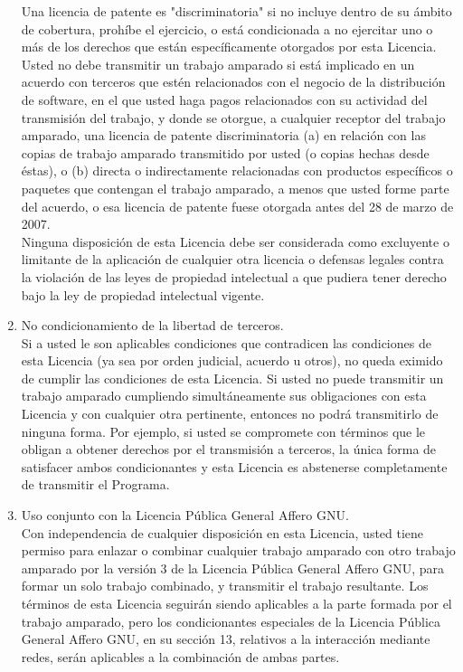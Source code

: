 \begin{enumerate}
		Una licencia de patente es "discriminatoria" si no incluye dentro de su ámbito de cobertura, prohíbe el ejercicio, o está condicionada a no ejercitar uno o más de los derechos que están específicamente otorgados por esta Licencia. Usted no debe transmitir un trabajo amparado si está implicado en un acuerdo con terceros que estén relacionados con el negocio de la distribución de software, en el que usted haga pagos relacionados con su actividad del transmisión del trabajo, y donde se otorgue, a cualquier receptor del trabajo amparado, una licencia de patente discriminatoria (a) en relación con las copias de trabajo amparado transmitido por usted (o copias hechas desde éstas), o (b) directa o indirectamente relacionadas con productos específicos o paquetes que contengan el trabajo amparado, a menos que usted forme parte del acuerdo, o esa licencia de patente fuese otorgada antes del 28 de marzo de 2007.\\
		
		Ninguna disposición de esta Licencia debe ser considerada como excluyente o limitante de la aplicación de cualquier otra licencia o defensas legales contra la violación de las leyes de propiedad intelectual a que pudiera tener derecho bajo la ley de propiedad intelectual vigente.\\
		
		\item No condicionamiento de la libertad de terceros.\\
		
		Si a usted le son aplicables condiciones que contradicen las condiciones de esta Licencia (ya sea por orden judicial, acuerdo u otros), no queda eximido de cumplir las condiciones de esta Licencia. Si usted no puede transmitir un trabajo amparado cumpliendo simultáneamente sus obligaciones con esta Licencia y con cualquier otra pertinente, entonces no podrá transmitirlo de ninguna forma. Por ejemplo, si usted se compromete con términos que le obligan a obtener derechos por el transmisión a terceros, la única forma de satisfacer ambos condicionantes y esta Licencia es abstenerse completamente de transmitir el Programa.\\
		
		\item Uso conjunto con la Licencia Pública General Affero GNU.\\
		
		Con independencia de cualquier disposición en esta Licencia, usted tiene permiso para enlazar o combinar cualquier trabajo amparado con otro trabajo amparado por la versión 3 de la Licencia Pública General Affero GNU, para formar un solo trabajo combinado, y transmitir el trabajo resultante. Los términos de esta Licencia seguirán siendo aplicables a la parte formada por el trabajo amparado, pero los condicionantes especiales de la Licencia Pública General Affero GNU, en su sección 13, relativos a la interacción mediante redes, serán aplicables a la combinación de ambas partes.\\
		

\end{enumerate}
